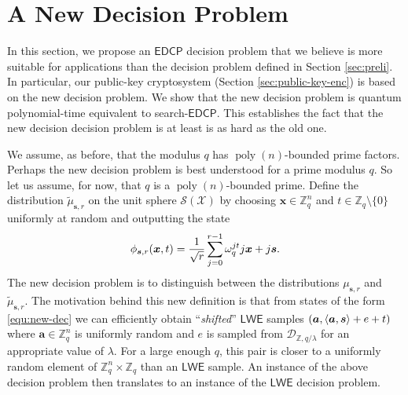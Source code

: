 \documentclass[11pt]{article}
\theoremstyle{plain}
\theoremstyle{definition}
\DeclareMathOperator{\poly}{poly}
\let\ket\relax
\DeclarePairedDelimiter{\ket}{\lvert}{\rangle}
\DeclarePairedDelimiter{\lrang}{\langle}{\rangle}
\def\Z{\mathbb{Z}}
\def\lwe{\mathsf{LWE}}
\def\edcp{\mathsf{EDCP}}
\def\SX{\mathcal{S(X)}}
\begin{document}



\section{A New Decision Problem}
\label{sec:new-decsn}

In this section, we propose an $\edcp$ decision problem that we believe is more suitable for applications than the decision problem defined in Section \ref{sec:preli}. In particular, our public-key cryptosystem (Section \ref{sec:public-key-enc}) is based on the new decision problem. We show that the new decision problem is quantum polynomial-time equivalent to search-$\edcp$. This establishes the fact that the new decision decision problem is at least is as hard as the old one.

We assume, as before, that the modulus $q$ has $\poly(n)$-bounded prime factors. Perhaps the new decision problem is best understood for a prime modulus $q$. So let us assume, for now, that $q$ is a $\poly(n)$-bounded prime. Define the distribution $\tilde{\mu}_{\bm{s}, r}$ on the unit sphere $\SX$ by choosing $\bm{x} \in \Z_q^n$ and $t \in \Z_q {\setminus} \{ 0 \}$ uniformly at random and outputting the state
\begin{equation}
    \label{equ:new-dec}
    \ket{\phi_{\bm{s}, r}(\bm{x}, t)} = \frac{1}{\sqrt{r}} \sum_{j = 0}^{r - 1} \omega_q^{jt} \ket{j}\ket{\bm{x} + j\bm{s}}.
\end{equation}
The new decision problem is to distinguish between the distributions $\mu_{\bm{s}, r}$ and $\tilde{\mu}_{\bm{s}, r}$. The motivation behind this new definition is that from states of the form \eqref{equ:new-dec} we can efficiently obtain ``\textit{shifted}'' $\lwe$ samples $(\bm{a}, \lrang{\bm{a}, \bm{s}} + e + t)$ where $\bm{a} \in \Z_q^n$ is uniformly random and $e$ is sampled from $\mathcal{D}_{\Z, q / \lambda}$ for an appropriate value of $\lambda$. For a large enough $q$, this pair is closer to a uniformly random element of $\Z_q^n \times \Z_q$ than an $\lwe$ sample. An instance of the above decision problem then translates to an instance of the $\lwe$ decision problem.
\end{document}
